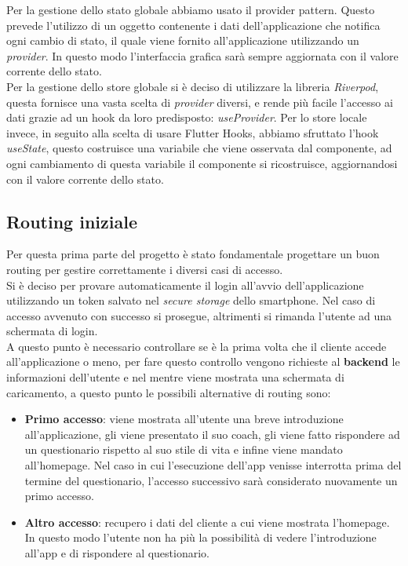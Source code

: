 Per la gestione dello stato globale abbiamo usato il provider pattern. Questo prevede l'utilizzo di un oggetto contenente i dati dell'applicazione che notifica ogni cambio di stato, il quale viene fornito all'applicazione utilizzando un \textit{provider}. In questo modo l'interfaccia grafica sarà sempre aggiornata con il valore corrente dello stato.\\
Per la gestione dello store globale si è deciso di utilizzare la libreria \textit{Riverpod}, questa fornisce una vasta scelta di \textit{provider} diversi, e rende più facile l'accesso ai dati grazie ad un hook da loro predisposto: \textit{useProvider}.
Per lo store locale invece, in seguito alla scelta di usare Flutter Hooks, abbiamo sfruttato l'hook \textit{useState}, questo costruisce una variabile che viene osservata dal componente, ad ogni cambiamento di questa variabile il componente si ricostruisce, aggiornandosi con il valore corrente dello stato.
\subsection{Routing iniziale}
Per questa prima parte del progetto è stato fondamentale progettare un buon routing per gestire correttamente i diversi casi di accesso.\\
Si è deciso per provare automaticamente il login all'avvio dell'applicazione utilizzando un token salvato nel \textit{secure storage} dello smartphone. Nel caso di accesso avvenuto con successo si prosegue, altrimenti si rimanda l'utente ad una schermata di login.\\
A questo punto è necessario controllare se è la prima volta che il cliente accede all'applicazione o meno, per fare questo controllo vengono richieste al \textbf{backend} le informazioni dell'utente e nel mentre viene mostrata una schermata di caricamento, a questo punto le possibili alternative di routing sono:
\begin{itemize}
    \item \textbf{Primo accesso}: viene mostrata all'utente una breve introduzione all'applicazione, gli viene presentato il suo coach, gli viene fatto rispondere ad un questionario rispetto al suo stile di vita e infine viene mandato all'homepage. Nel caso in cui l'esecuzione dell'app venisse interrotta prima del termine del questionario, l'accesso successivo sarà considerato nuovamente un primo accesso.
    \item \textbf{Altro accesso}: recupero i dati del cliente a cui viene mostrata l'homepage. In questo modo l'utente non ha più la possibilità di vedere l'introduzione all'app e di rispondere al questionario.
\end{itemize}
